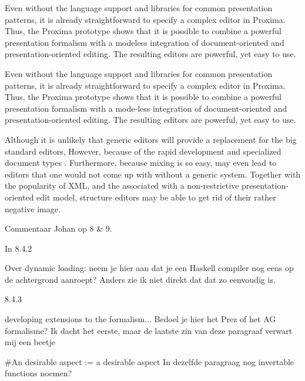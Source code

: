 Even without the language support and libraries for common presentation patterns, it is already straightforward to specify a complex editor in Proxima. Thus, the Proxima prototype shows that it is possible to combine a powerful presentation formalism with a mode\-less integration of document-oriented and presentation-oriented editing. The resulting editors are powerful, yet easy to use.


\bc

Even without the language support and libraries for common presentation patterns, it is already straightforward to specify a complex editor in Proxima. Thus, the Proxima prototype shows that it is possible to combine a powerful presentation formalism with a mode-less integration of document-oriented and presentation-oriented editing. The resulting editors are powerful, yet easy to use.
\ec


\bc
\toHere
Although it is unlikely that generic editors will provide a replacement for the big standard editors,  However, because of the rapid development and  specialized document types . Furthermore, because mixing is so easy, may even lead to editors that one would not come up with without a generic system. Together with the popularity of XML, and the associated with a non-restrictive presentation-oriented edit model, structure editors may be able to get rid of their rather negative image.
\ec








\bc
Commentaar Johan op 8 & 9.

In 8.4.2

Over dynamic loading: neem je hier aan dat je een Haskell compiler nog
eens op de achtergrond aanroept? Anders zie ik niet direkt dat dat zo
eenvoudig is.


8.4.3


developing extensions to the formalism... Bedoel je hier het Prez of het
AG formalisme? Ik dacht het eerste, maar de laatste zin van deze paragraaf
verwart mij een beetje

#An desirable aspect := a desirable aspect
In dezelfde paragraag nog invertable functions noemen?

